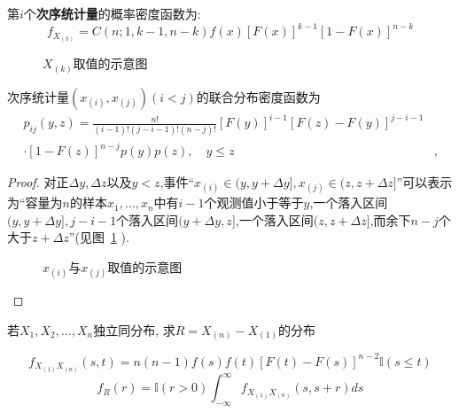 \begin{theorem}
    第$i$个\textbf{次序统计量}的概率密度函数为:
    \[ f_{X_{(k)}} = C(n;1,k-1,n-k)f(x)[F(x)]^{k-1}[1-F(x)]^{n-k}  \]
\end{theorem}

\begin{figure}[!ht]
    \centering
    \caption{$X_{(k)}$取值的示意图}
\end{figure}

\begin{theorem}
    次序统计量$(x_{(i)},x_{(j)})(i<j)$的联合分布密度函数为
    \begin{align*}
        p_{ij}(y,z)=\frac{n!}{(i-1)!(j-i-1)!(n-j)!}[F(y)]^{i-1}[F(z)-F(y)]^{j-i-1} &   \\
        \cdot[1-F(z)]^{n-j}p(y)p(z),\quad y\leq z                                  & ,
    \end{align*}
\end{theorem}

\begin{proof}
    对正$\Delta y,\Delta z$以及$y<z$,事件``$x_{(i)}\in(y,y+\Delta y],x_{(j)}\in(z,z+\Delta z]$''可以表示为``容量为$n$的样本$x_1,\dotsc,x_n$中有$i-1$个观测值小于等于$y$,一个落入区间$(y,y+\Delta y],j-i-1$个落入区间$(y+\Delta y,z]$,一个落入区间$(z,z+\Delta z]$,而余下$n-j$个大于$z+\Delta z$''(见图~\ref{fig:5.3.6} ).
    \begin{figure}[!ht]
        \centering
        \caption{$x_{(i)}$与$x_{(j)}$取值的示意图}\label{fig:5.3.6}
    \end{figure}
\end{proof}
\begin{example}
    若$X_1,X_2,\dotsc,X_n$独立同分布, 求$R=X_{(n)}-X_{(1)}$的分布
\end{example}

\begin{solution}
    \[ f_{X_{(1)}X_{(n)}}(s,t)=n(n-1)f(s)f(t)[F(t)-F(s)]^{n-2}\mathbb{I}(s\le t) \]
    \[ f_R(r)=\mathbb{I}(r>0)\int_{-\infty}^{\infty}f_{X_{(1)}X_{(n)}}(s,s+r)ds \]
\end{solution}
